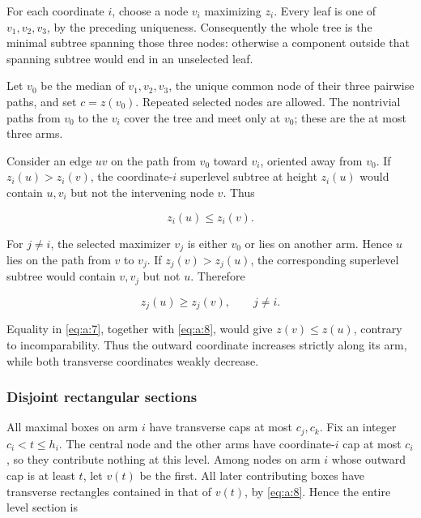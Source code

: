 For each coordinate \(i\), choose a node \(v_i\) maximizing \(z_i\). Every
leaf is one of \(v_1,v_2,v_3\), by the preceding uniqueness. Consequently
the whole tree is the minimal subtree spanning those three nodes: otherwise
a component outside that spanning subtree would end in an unselected leaf.

Let \(v_0\) be the median of \(v_1,v_2,v_3\), the unique common node of
their three pairwise paths, and set \(c=z(v_0)\). Repeated selected nodes are
allowed. The nontrivial paths from \(v_0\) to the \(v_i\) cover the tree and
meet only at \(v_0\); these are the at most three arms.

Consider an edge \(uv\) on the path from \(v_0\) toward \(v_i\), oriented
away from \(v_0\). If \(z_i(u)>z_i(v)\), the coordinate-\(i\) superlevel
subtree at height \(z_i(u)\) would contain \(u,v_i\) but not the intervening
node \(v\). Thus

\begin{equation}
z_i(u)\le z_i(v).
\label{eq:a:7}
\end{equation}

For \(j\ne i\), the selected maximizer \(v_j\) is either \(v_0\) or lies
on another arm. Hence \(u\) lies on the path from \(v\) to \(v_j\). If
\(z_j(v)>z_j(u)\), the corresponding superlevel subtree would contain
\(v,v_j\) but not \(u\). Therefore

\begin{equation}
z_j(u)\ge z_j(v),\qquad j\ne i.
\label{eq:a:8}
\end{equation}

Equality in \eqref{eq:a:7}, together with \eqref{eq:a:8}, would give \(z(v)\le z(u)\), contrary
to incomparability. Thus the outward coordinate increases strictly along
its arm, while both transverse coordinates weakly decrease.

\subsubsection{Disjoint rectangular sections}

All maximal boxes on arm \(i\) have transverse caps at most \(c_j,c_k\).
Fix an integer \(c_i<t\le h_i\). The central node and the other arms have
coordinate-\(i\) cap at most \(c_i\), so they contribute nothing at this
level. Among nodes on arm \(i\) whose outward cap is at least \(t\), let
\(v(t)\) be the first. All later contributing boxes have transverse
rectangles contained in that of \(v(t)\), by \eqref{eq:a:8}. Hence the entire level
section is

